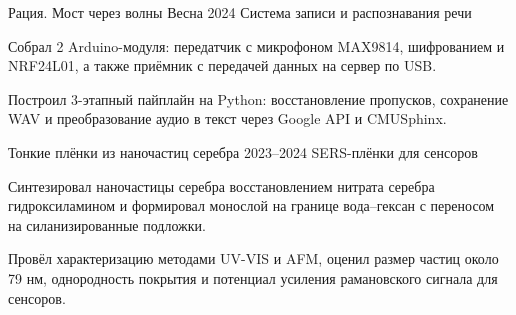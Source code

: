\documentclass[10pt,a4paper]{article}
\begin{document}
{\begin{minipage}[t][\pagecontentheight]{\sidebarwidth}
\begin{minipage}[t][\sidebarinnerheight]{\sidebarinnerwidth}
    \SidebarSectionSep
    \LeftFooter{}
  \end{minipage}
\end{minipage}%
\begin{minipage}[t][\pagecontentheight]{\mainwidth}
  \vspace*{0.70cm}
  \hspace*{0.66cm}\begin{minipage}[t][\maininnerheight]{\maininnerwidth}
    \vspace{0.09cm}
    \vspace{0.03cm}
    \HeaderGap


    \vspace{0.24cm}
    \MainEntry
      {Рация. Мост через волны}
      {Весна 2024}
      {Система записи и распознавания речи}
      {}
      {\begin{mainbullets}
        \item Собрал 2 Arduino-модуля: передатчик с микрофоном MAX9814, шифрованием и NRF24L01, а также приёмник с передачей данных на сервер по USB.
        \item Построил 3-этапный пайплайн на Python: восстановление пропусков, сохранение WAV и преобразование аудио в текст через Google API и CMUSphinx.
      \end{mainbullets}}

    \MainEntry
      {Тонкие плёнки из наночастиц серебра}
      {2023--2024}
      {SERS-плёнки для сенсоров}
      {}
      {\begin{mainbullets}
        \item Синтезировал наночастицы серебра восстановлением нитрата серебра гидроксиламином и формировал монослой на границе вода--гексан с переносом на силанизированные подложки.
        \item Провёл характеризацию методами UV-VIS и AFM, оценил размер частиц около 79 нм, однородность покрытия и потенциал усиления рамановского сигнала для сенсоров.
      \end{mainbullets}}


\end{minipage}
\end{minipage}}
\end{document}
